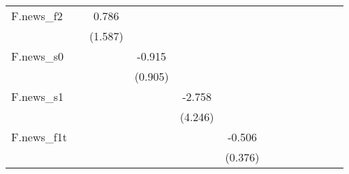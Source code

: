 {\begin{tabular}{l*{12}{c}}
\addlinespace
F.news\_f2   &                     &       0.786         &                     &                     &                     &                     &                     &                     &                     &                     &                     &                     \\
            &                     &     (1.587)         &                     &                     &                     &                     &                     &                     &                     &                     &                     &                     \\
\addlinespace
F.news\_s0   &                     &                     &      -0.915         &                     &                     &                     &                     &                     &                     &                     &                     &                     \\
            &                     &                     &     (0.905)         &                     &                     &                     &                     &                     &                     &                     &                     &                     \\
\addlinespace
F.news\_s1   &                     &                     &                     &      -2.758         &                     &                     &                     &                     &                     &                     &                     &                     \\
            &                     &                     &                     &     (4.246)         &                     &                     &                     &                     &                     &                     &                     &                     \\
\addlinespace
F.news\_f1t  &                     &                     &                     &                     &      -0.506         &                     &                     &                     &                     &                     &                     &                     \\
            &                     &                     &                     &                     &     (0.376)         &                     &                     &                     &                     &                     &                     &                     \\

\end{tabular}}
